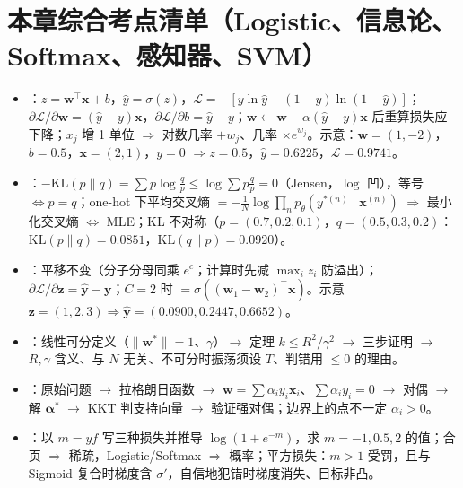\section{本章综合考点清单（Logistic、信息论、Softmax、感知器、SVM）}
\begin{itemize}
\item {}：$z=\bm w^\top\bm x+b$，$\hat y=\sigma(z)$，$\mathcal L=-[y\ln\hat y+(1-y)\ln(1-\hat y)]$；$\partial\mathcal L/\partial\bm w=(\hat y-y)\bm x$，$\partial\mathcal L/\partial b=\hat y-y$；$\bm w\leftarrow\bm w-\alpha(\hat y-y)\bm x$ 后重算损失应下降；$x_j$ 增 1 单位 $\Rightarrow$ 对数几率 $+w_j$、几率 $\times e^{w_j}$。示意：$\bm w=(1,-2)$，$b=0.5$，$\bm x=(2,1)$，$y=0$ $\Rightarrow z=0.5$，$\hat y=0.6225$，$\mathcal L=0.9741$。
\item {}：$-\mathrm{KL}(p\|q)=\sum p\log\frac qp\le\log\sum p\frac qp=0$（Jensen，$\log$ 凹），等号 $\iff p=q$；one-hot 下平均交叉熵 $=-\frac1N\log\prod_np_\theta(y^{*(n)}\mid\bm x^{(n)})$ $\Rightarrow$ 最小化交叉熵 $\iff$ MLE；KL 不对称（$p=(0.7,0.2,0.1)$，$q=(0.5,0.3,0.2)$：$\mathrm{KL}(p\|q)=0.0851$，$\mathrm{KL}(q\|p)=0.0920$）。
\item {}：平移不变（分子分母同乘 $e^c$；计算时先减 $\max_iz_i$ 防溢出）；$\partial\mathcal L/\partial\bm z=\hat{\bm y}-\bm y$；$C=2$ 时 $=\sigma((\bm w_1-\bm w_2)^\top\bm x)$。示意 $\bm z=(1,2,3)\Rightarrow\hat{\bm y}=(0.0900,0.2447,0.6652)$。
\item {}：线性可分定义（$\|\bm w^*\|=1$、$\gamma$）$\to$ 定理 $k\le R^2/\gamma^2$ $\to$ 三步证明 $\to$ $R,\gamma$ 含义、与 $N$ 无关、不可分时振荡须设 $T$、判错用 $\le0$ 的理由。
\item {}：原始问题 $\to$ 拉格朗日函数 $\to$ $\bm w=\sum\alpha_iy_i\bm x_i$、$\sum\alpha_iy_i=0$ $\to$ 对偶 $\to$ 解 $\bm\alpha^*$ $\to$ KKT 判支持向量 $\to$ 验证强对偶；边界上的点不一定 $\alpha_i>0$。
\item {}：以 $m=yf$ 写三种损失并推导 $\log(1+e^{-m})$，求 $m=-1,0.5,2$ 的值；合页 $\Rightarrow$ 稀疏，Logistic/Softmax $\Rightarrow$ 概率；平方损失：$m>1$ 受罚，且与 Sigmoid 复合时梯度含 $\sigma'$，自信地犯错时梯度消失、目标非凸。
\end{itemize}

